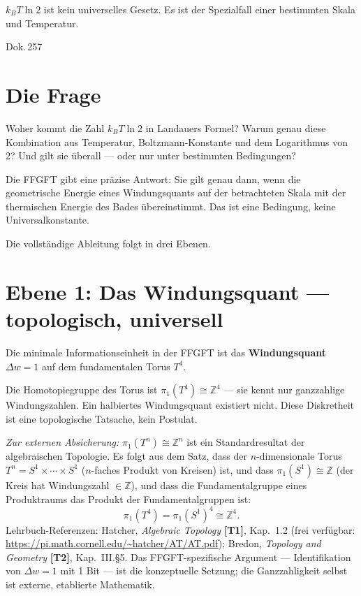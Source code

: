 \label{ch:informationseinheit_skala}

\epigraph{$k_BT\ln 2$ ist kein universelles Gesetz.
Es ist der Spezialfall einer bestimmten Skala und Temperatur.}{Dok.\,257}

\section{Die Frage}

Woher kommt die Zahl $k_BT\ln 2$ in Landauers Formel? Warum
genau diese Kombination aus Temperatur, Boltzmann-Konstante und dem Logarithmus
von 2? Und gilt sie überall --- oder nur unter bestimmten Bedingungen?

Die FFGFT gibt eine präzise Antwort: Sie gilt genau dann, wenn die
geometrische Energie eines Windungsquants auf der betrachteten Skala
mit der thermischen Energie des Bades übereinstimmt. Das ist eine
Bedingung, keine Universalkonstante.

Die vollständige Ableitung folgt in drei Ebenen. 

\section{Ebene 1: Das Windungsquant --- topologisch, universell}

\begin{keyresult}
Die minimale Informationseinheit in der FFGFT ist das \textbf{Windungsquant}
$\Delta w = 1$ auf dem fundamentalen Torus $T^4$.

Die Homotopiegruppe des Torus ist $\pi_1(T^4) \cong \mathbb{Z}^4$ ---
sie kennt nur ganzzahlige Windungszahlen. Ein halbiertes Windungsquant
existiert nicht. Diese Diskretheit ist eine topologische Tatsache,
kein Postulat. 
\end{keyresult}

\textit{Zur externen Absicherung:} $\pi_1(T^n) \cong \mathbb{Z}^n$ ist ein
Standardresultat der algebraischen Topologie. Es folgt aus dem Satz, dass
der $n$-dimensionale Torus $T^n = S^1 \times \cdots \times S^1$ ($n$-faches
Produkt von Kreisen) ist, und dass $\pi_1(S^1) \cong \mathbb{Z}$ (der
Kreis hat Windungszahl $\in \mathbb{Z}$), und dass die Fundamentalgruppe
eines Produktraums das Produkt der Fundamentalgruppen ist:
\[
  \pi_1(T^4) = \pi_1(S^1)^4 \cong \mathbb{Z}^4.
\]
Lehrbuch-Referenzen: Hatcher, \textit{Algebraic Topology} \textbf{[T1]},
Kap.~1.2 (frei verfügbar: \url{https://pi.math.cornell.edu/~hatcher/AT/AT.pdf});
Bredon, \textit{Topology and Geometry} \textbf{[T2]}, Kap.~III.§5.
Das FFGFT-spezifische Argument --- Identifikation von $\Delta w = 1$ mit
1 Bit --- ist die konzeptuelle Setzung; die Ganzzahligkeit selbst ist
externe, etablierte Mathematik. 

